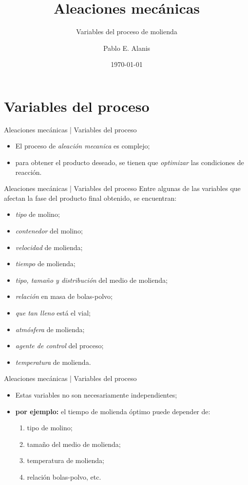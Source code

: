 \documentclass[%
spanish,
    progressbar=head,
background=dark,
subsectionpage
]{beamer}
\title{Aleaciones mecánicas}
\subtitle{Variables del proceso de molienda}
\date{\today}
\author{Pablo E. Alanis}
\institute{Universidad Autónoma de Nuevo Leon, División de Posgrado\\Técnicas de preparación de materiales}
\begin{document}
\maketitle

\section{Variables del proceso}
\begin{frame}{Aleaciones mecánicas | Variables del proceso}
    \begin{itemize}
        \item El proceso de \emph{aleación mecanica} es complejo;
        \item para obtener el producto deseado, se tienen que \textit{optimizar} las condiciones de reacción.
    \end{itemize}
\end{frame}

\begin{frame}{Aleaciones mecánicas | Variables del proceso}
    Entre algunas de las variables que afectan la fase del producto final obtenido, se encuentran:

    \begin{itemize}
        \item \emph{tipo} de molino;
        \item \emph{contenedor} del molino;
        \item \emph{velocidad} de molienda;
        \item \emph{tiempo} de molienda;
        \item \emph{tipo, tamaño y distribución} del medio de molienda;
        \item \emph{relación} en masa de bolas-polvo;
        \item \emph{que tan lleno} está el vial;
        \item \emph{atmósfera} de molienda;
        \item \emph{agente de control} del proceso;
        \item \emph{temperatura} de molienda.
    \end{itemize}
\end{frame}

\begin{frame}{Aleaciones mecánicas | Variables del proceso}
\begin{itemize}
    \item Estas variables no son necesariamente independientes;\\
    \item[] \textbf{por ejemplo:} el tiempo de molienda óptimo puede depender de: 
    \begin{enumerate}
        \item tipo de molino;
        \item tamaño del medio de molienda;
        \item temperatura de molienda;
        \item relación bolas-polvo, etc.
    \end{enumerate}
\end{itemize}
\end{frame}
\end{document}
